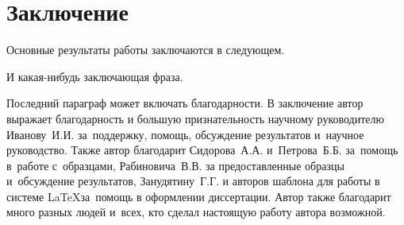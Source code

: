\chapter*{Заключение}                       %


Основные результаты работы заключаются в следующем.

И какая-нибудь заключающая фраза.

Последний параграф может включать благодарности.  В заключение автор выражает благодарность и большую признательность научному руководителю Иванову~И.\:И. за~поддержку, помощь, обсуждение результатов и~научное руководство. Также автор благодарит Сидорова~А.\:А. и~Петрова~Б.\:Б. за~помощь в~работе с~образцами, Рабиновича~В.\:В. за предоставленные образцы и~обсуждение результатов, Занудятину~Г.\:Г. и авторов шаблона  для работы в системе \LaTeX за~помощь в оформлении диссертации. Автор также благодарит много разных людей и~всех, кто сделал настоящую работу автора возможной.
